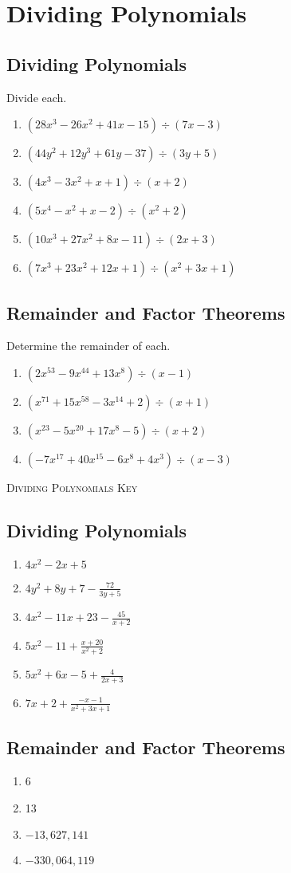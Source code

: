 \chapter{Dividing Polynomials}

\section{Dividing Polynomials}

Divide each.
\begin{enumerate}
    \item $(28x^3-26x^2+41x-15) \div (7x-3)$
    \item $(44y^2+12y^3+61y-37) \div (3y+5)$
    \item $\left(4x^3 - 3x^2 + x + 1\right) \div (x + 2)$
    \item $\left(5x^4 - x^2 + x - 2\right) \div (x^2 + 2)$
    \item $\left(10x^3 + 27x^2 + 8x - 11\right) \div (2x+3)$
	\item $\left(7x^3 + 23x^2 + 12x + 1\right) \div \left(x^2+3x+1\right)$
\end{enumerate}

\section{Remainder and Factor Theorems}

Determine the remainder of each.
\begin{enumerate}
	\item $\left(2x^{53} - 9x^{44} + 13x^8\right) \div (x - 1)$
	\item $\left(x^{71} + 15x^{58} - 3x^{14} + 2\right) \div (x + 1)$
	\item $\left(x^{23}-5x^{20}+17x^8-5\right) \div (x+2)$
	\item $\left(-7x^{17} + 40x^{15} - 6x^8 + 4x^3\right) \div (x-3)$
\end{enumerate}

\newpage

\textsc{Dividing Polynomials Key}

\section*{Dividing Polynomials}

\begin{enumerate}
    \item $4x^2-2x+5$
    \item $4y^2+8y+7-\frac{72}{3y+5}$
    \item $4x^2 - 11x + 23 - \frac{45}{x+2}$
    \item $5x^2 - 11 + \frac{x+20}{x^2+2}$
    \item $5x^2 + 6x - 5 + \frac{4}{2x+3}$
    \item $7x + 2 + \frac{-x-1}{x^2+3x+1}$
\end{enumerate}

\section*{Remainder and Factor Theorems}

\begin{enumerate}
	\item 6
	\item 13
	\item $-13,627,141$
    \item $-330,064,119$
\end{enumerate}